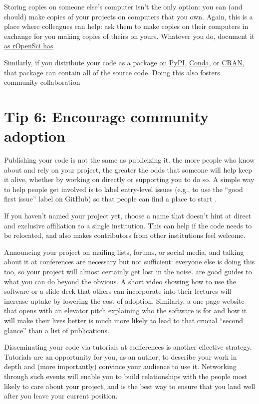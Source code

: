 \documentclass[10pt,letterpaper]{article}
\begin{document}
Storing copies on someone else's computer isn't the only option:
you can (and should) make copies of your projects on computers that you own.
Again,
this is a place where colleagues can help:
ask them to make copies on their computers in exchange for you making copies of theirs on yours.
Whatever you do,
document it \href{https://ropensci.org/blog/2022/03/22/safeguards-and-backups-for-github-organizations/}{as rOpenSci has}.

Similarly,
if you distribute your code as a package on \href{https://pypi.org/}{PyPI},
\href{https://anaconda.org/anaconda/conda}{Conda},
or \href{https://cran.r-project.org/}{CRAN},
that package can contain all of the source code.
Doing this also fosters community collaboration

\section*{Tip 6: Encourage community adoption}

Publishing your code is not the same as publicizing it.
the more people who know about and rely on your project,
the greater the odds that someone will help keep it alive,
whether by working on directly or supporting you to do so.
A simple way to help people get involved is to label entry-level issues
(e.g., to use the ``good first issue'' label on GitHub)
so that people can find a place to start \cite{Steinmacher2015}.

If you haven't named your project yet,
choose a name that doesn't hint at direct and exclusive affiliation to a single institution.
This can help if the code needs to be relocated,
and also makes contributors from other institutions feel welcome.

Announcing your project on mailing lists, forums, or social media,
and talking about it at conferences are necessary but not sufficient:
everyone else is doing this too,
so your project will almost certainly get lost in the noise.
\cite{Kuchner2011,BelliniSaibene2024} are good guides to what you can do beyond the obvious.
A short video showing how to use the software
or a slide deck that others can incorporate into their lectures
will increase uptake by lowering the cost of adoption.
Similarly,
a one-page website that opens with an elevator pitch
explaining who the software is for
and how it will make their lives better
is much more likely to lead to that crucial ``second glance''
than a list of publications.

Disseminating your code via tutorials at conferences is another effective strategy.
Tutorials are an opportunity for you,
as an author,
to describe your work in depth
and (more importantly) convince your audience to use it.
Networking through such events will enable you to build relationships with
the people most likely to care about your project,
and is the best way to ensure that you land well after you leave your current position.
\end{document}
